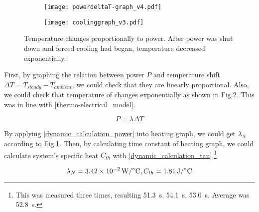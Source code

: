 \begin{figure}[t]
	\centering
	\begin{subfigure}[t]{0.4\linewidth}
		\centering\texttt{[image: powerdeltaT-graph\_v4.pdf]}
		\caption{\label{powerdeltaT}}
	\end{subfigure}%
	\begin{subfigure}[t]{0.4\linewidth}
		\centering\texttt{[image: coolinggraph\_v3.pdf]}
		\caption{\label{coolinggraph}}
	\end{subfigure}
	\caption[Results of dynamic experiment]{ Temperature changes proportionally to power.  After power was shut down and forced cooling had began, temperature decreased exponentially.}
	\label{result_dynamic}
\end{figure}

First, by graphing the relation between power $P$ and temperature shift $\Delta{T}=T_{steady}-T_{ambient}$, we could check that they are linearly proportional.
Also, we could check that temperature of \scp changes exponentially as shown in Fig.\ref{coolinggraph}. This was in line with  \eqref{thermo-electrical_model}.

\begin{equation} \label{dynamic_calculation_power}
P = \lambda\Delta{T}
\end{equation}

By applying \eqref{dynamic_calculation_power} into heating graph, we could get $\lambda_{N}$ according to Fig.\ref{powerdeltaT}. Then, by calculating time constant of heating graph, we could calculate \scp system's specific heat $C_{th}$ with \eqref{dynamic_calculation_tau}.\footnote{This was measured three times, resulting \SI{51.3}{\second}, \SI{54.1}{\second}, \SI{53.0}{\second}. Average was \SI{52.8}{\second}.} 

\begin{equation}
\lambda_{N}=\SI{3.42e-2}{\watt\per\degreeCelsius}, C_{th}=\SI{1.81}{\joule\per\degreeCelsius} \notag
\end{equation}



